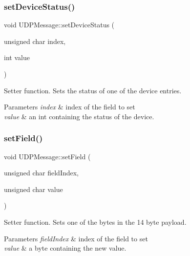 \subsubsection{\texorpdfstring{set\+Device\+Status()}{setDeviceStatus()}}
{\footnotesize\ttfamily void U\+D\+P\+Message\+::set\+Device\+Status (\begin{DoxyParamCaption}\item[{unsigned char}]{index,  }\item[{int}]{value }\end{DoxyParamCaption})\hspace{0.3cm}{\ttfamily [inline]}}

Setter function. Sets the status of one of the device entries. 
\begin{DoxyParams}{Parameters}
{\em index} & index of the field to set \\
\hline
{\em value} & an int containing the status of the device. \\
\hline
\end{DoxyParams}
\mbox{\label{class_u_d_p_message_ad7f1c729cf357be18e6cda695f5e5d99}} 
\subsubsection{\texorpdfstring{set\+Field()}{setField()}}
{\footnotesize\ttfamily void U\+D\+P\+Message\+::set\+Field (\begin{DoxyParamCaption}\item[{unsigned char}]{field\+Index,  }\item[{unsigned char}]{value }\end{DoxyParamCaption})\hspace{0.3cm}{\ttfamily [inline]}}

Setter function. Sets one of the bytes in the 14 byte payload. 
\begin{DoxyParams}{Parameters}
{\em field\+Index} & index of the field to set \\
\hline
{\em value} & a byte containing the new value. \\
\hline
\end{DoxyParams}
\mbox{\label{class_u_d_p_message_a2fcacc64fbb5598848a391c9fd9aa8c2}} 
